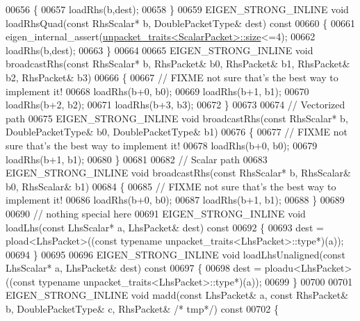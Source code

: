 \begin{DoxyCode}
00656 \textcolor{keyword}{  }\{
00657     loadRhs(b,dest);
00658   \}
00659   EIGEN\_STRONG\_INLINE \textcolor{keywordtype}{void} loadRhsQuad(\textcolor{keyword}{const} RhsScalar* b, DoublePacketType& dest)\textcolor{keyword}{ const}
00660 \textcolor{keyword}{  }\{
00661     eigen\_internal\_assert(\hyperlink{struct_eigen_1_1internal_1_1unpacket__traits}{unpacket\_traits<ScalarPacket>::size}<=4);
00662     loadRhs(b,dest);
00663   \}
00664   
00665   EIGEN\_STRONG\_INLINE \textcolor{keywordtype}{void} broadcastRhs(\textcolor{keyword}{const} RhsScalar* b, RhsPacket& b0, RhsPacket& b1, RhsPacket& b2, 
      RhsPacket& b3)
00666   \{
00667     \textcolor{comment}{// FIXME not sure that's the best way to implement it!}
00668     loadRhs(b+0, b0);
00669     loadRhs(b+1, b1);
00670     loadRhs(b+2, b2);
00671     loadRhs(b+3, b3);
00672   \}
00673   
00674   \textcolor{comment}{// Vectorized path}
00675   EIGEN\_STRONG\_INLINE \textcolor{keywordtype}{void} broadcastRhs(\textcolor{keyword}{const} RhsScalar* b, DoublePacketType& b0, DoublePacketType& b1)
00676   \{
00677     \textcolor{comment}{// FIXME not sure that's the best way to implement it!}
00678     loadRhs(b+0, b0);
00679     loadRhs(b+1, b1);
00680   \}
00681   
00682   \textcolor{comment}{// Scalar path}
00683   EIGEN\_STRONG\_INLINE \textcolor{keywordtype}{void} broadcastRhs(\textcolor{keyword}{const} RhsScalar* b, RhsScalar& b0, RhsScalar& b1)
00684   \{
00685     \textcolor{comment}{// FIXME not sure that's the best way to implement it!}
00686     loadRhs(b+0, b0);
00687     loadRhs(b+1, b1);
00688   \}
00689 
00690   \textcolor{comment}{// nothing special here}
00691   EIGEN\_STRONG\_INLINE \textcolor{keywordtype}{void} loadLhs(\textcolor{keyword}{const} LhsScalar* a, LhsPacket& dest)\textcolor{keyword}{ const}
00692 \textcolor{keyword}{  }\{
00693     dest = pload<LhsPacket>((\textcolor{keyword}{const} \textcolor{keyword}{typename} unpacket\_traits<LhsPacket>::type*)(a));
00694   \}
00695 
00696   EIGEN\_STRONG\_INLINE \textcolor{keywordtype}{void} loadLhsUnaligned(\textcolor{keyword}{const} LhsScalar* a, LhsPacket& dest)\textcolor{keyword}{ const}
00697 \textcolor{keyword}{  }\{
00698     dest = ploadu<LhsPacket>((\textcolor{keyword}{const} \textcolor{keyword}{typename} unpacket\_traits<LhsPacket>::type*)(a));
00699   \}
00700 
00701   EIGEN\_STRONG\_INLINE \textcolor{keywordtype}{void} madd(\textcolor{keyword}{const} LhsPacket& a, \textcolor{keyword}{const} RhsPacket& b, DoublePacketType& c, RhsPacket& \textcolor{comment}{/*
      tmp*/})\textcolor{keyword}{ const}
00702 \textcolor{keyword}{  }\{

\end{DoxyCode}
